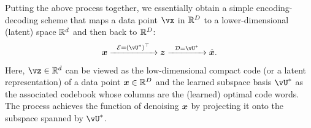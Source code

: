 \documentclass[../../book-main.tex]{subfiles}
\begin{document}
Putting the above process together, we essentially obtain a simple encoding-decoding scheme that maps a data point $\vx$ in $\mathbb{R}^D$ to a lower-dimensional (latent) space $\mathbb{R}^d$ and then back to $\mathbb{R}^D$:
\begin{equation}
\x \xrightarrow{\hspace{2mm} \mathcal{E} = (\vU^\ast)^\top \hspace{2mm}}  \z \xrightarrow{\hspace{2mm} \mathcal{D} = \vU^\ast \hspace{2mm}}   \hat{\x}.  
\label{eqn:autoencoding-PCA}
\end{equation}
Here, $\vz \in \R^d$ can be viewed as the low-dimensional compact code (or a latent representation) of a data point  $\bm{x} \in \mathbb{R}^D$ and the learned subspace basis $\vU^\ast$ as the associated codebook whose columns are the (learned) optimal code words. The process achieves the function of denoising $\bm{x}$ by projecting it onto the subspace spanned by $\vU^\ast$.
\end{document}
